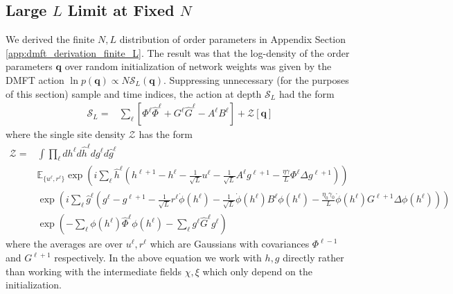 \documentclass{article} %
\def\q{\bm q}
\begin{document}
\subsection{Large $L$ Limit at Fixed $N$}
We derived the finite $N , L$ distribution of order parameters in Appendix Section \ref{app:dmft_derivation_finite_L}. The result was that the log-density of the order parameters $\bm q$ over random initialization of network weights was given by the DMFT action $\ln p(\q) \propto N \mathcal S_L(\q)$. Suppressing unnecessary (for the purposes of this section) sample and time indices, the action at depth $\mathcal S_L$ had the form
\begin{align}
    \mathcal S_L = &\sum_{\ell} \left[ \Phi^\ell \hat\Phi^\ell + G^\ell 
    \hat G^\ell - A^\ell B^\ell \right] + \mathcal{Z}[\bm q]
\end{align}
where the single site density $\mathcal Z$ has the form
\begin{align}
    \mathcal Z = &\int \prod_{\ell} dh^\ell d\hat{h}^\ell dg^\ell d\hat{g}^\ell \nonumber
    \\
    &\mathbb{E}_{\{ u^\ell,r^\ell\} } \exp\left( i \sum_\ell \hat{h}^\ell \left( h^{\ell+1} - h^{\ell} - \frac{1}{\sqrt L} u^\ell - \frac{1}{\sqrt L} A^\ell g^{\ell+1} - \frac{\eta\gamma}{L} \Phi^{\ell} \Delta g^{\ell+1} \right) \right) \nonumber
    \\
    &\exp\left( i \sum_\ell \hat{g}^\ell \left( g^{\ell} - g^{\ell+1} - \frac{1}{\sqrt L} r^\ell \dot\phi(h^\ell) - \frac{1}{\sqrt L}  \dot\phi(h^\ell) B^\ell \phi(h^\ell) - \frac{\eta_0\gamma_0}{L} \dot\phi(h^\ell) G^{\ell+1} \Delta \phi(h^\ell)  \right) \right) \nonumber
    \\
    &\exp\left( - \sum_\ell \phi(h^\ell) \hat\Phi^\ell \phi(h^\ell) - \sum_\ell g^\ell \hat G^\ell g^\ell \right)
\end{align}
where the averages are over $u^\ell, r^\ell$ which are Gaussians with covariances $\Phi^{\ell-1}$ and $G^{\ell+1}$ respectively. In the above equation we work with $h, g$ directly rather than working with the intermediate fields $\chi, \xi$ which only depend on the initialization.  
\end{document}
